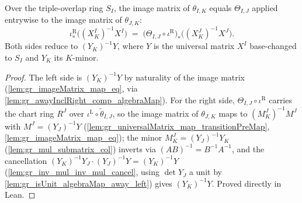 \begin{lemma}

  \label{lem:gr_cocycle_imageMatrix_eq}
  Over the triple-overlap ring \(S_I\), the image matrix of \(\theta_{I,K}\)
  equals \(\Theta_{I,J}\) applied entrywise to the image matrix of
  \(\theta_{J,K}\):
  \[
    \iota^{\mathrm{R}}_\ast\bigl((X^I_K)^{-1} X^I\bigr)
      \;=\;
      \bigl(\Theta_{I,J}\circ\iota^{\mathrm{R}}\bigr)_\ast
        \bigl((X^J_K)^{-1} X^J\bigr) .
  \]
  Both sides reduce to \((Y_K)^{-1} Y\), where \(Y\) is the universal matrix
  \(X^I\) base-changed to \(S_I\) and \(Y_K\) its \(K\)-minor.
\end{lemma}
\begin{proof}

\leanok
  The left side is \((Y_K)^{-1} Y\) by naturality of the image matrix
  (\cref{lem:gr_imageMatrix_map_eq}, via \cref{lem:gr_awayInclRight_comp_algebraMap}).
  For the right side, \(\Theta_{I,J}\circ\iota^{\mathrm{R}}\) carries the chart
  ring \(R^J\) over \(\iota^{\mathrm{L}}\circ\tilde\theta_{I,J}\), so the image
  matrix of \(\theta_{J,K}\) maps to \((M^J_K)^{-1} M^J\) with
  \(M^J = (Y_J)^{-1} Y\) (\cref{lem:gr_universalMatrix_map_transitionPreMap},
  \cref{lem:gr_imageMatrix_map_eq}); the minor \(M^J_K = (Y_J)^{-1} Y_K\)
  (\cref{lem:gr_mul_submatrix_col}) inverts via \((AB)^{-1} = B^{-1}A^{-1}\), and
  the cancellation \((Y_K)^{-1} Y_J \cdot (Y_J)^{-1} Y = (Y_K)^{-1} Y\)
  (\cref{lem:gr_inv_mul_inv_mul_cancel}, using \(\det Y_J\) a unit by
  \cref{lem:gr_isUnit_algebraMap_away_left}) gives \((Y_K)^{-1} Y\). Proved
  directly in Lean.
\end{proof}

